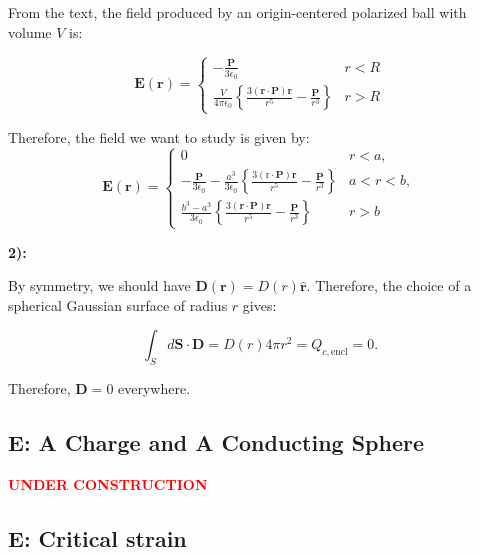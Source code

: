 From the text, the field produced by an origin-centered polarized ball with volume $V$ is:
	
\begin{equation}
	\mathbf{E}(\mathbf{r})=\left\{\begin{array}{ll}-\frac{\mathbf{P}}{3 \epsilon_{0}} & r<R \\
	\frac{V}{4 \pi \epsilon_{0}}\left\{\frac{3(\mathbf{r} \cdot \mathbf{P}) \mathbf{r}}{r^{5}}-\frac{\mathbf{P}}{r^{3}}\right\} & r>R
	\end{array}\right.
\end{equation}

Therefore, the field we want to study is given by:
\begin{equation}
	\mathbf{E}(\mathbf{r})=\left\{\begin{array}{ll}
		0 \quad & r<a, \\
		-\frac{\mathbf{P}}{3 \epsilon_{0}}-\frac{a^{3}}{3 \epsilon_{0}}\left\{\frac{3(\mathrm{r} \cdot \mathbf{P}) \mathbf{r}}{r^{5}}-\frac{\mathbf{P}}{r^{3}}\right\} & a<r<b, \\
		\frac{b^{3}-a^{3}}{3 \epsilon_{0}}\left\{\frac{3(\mathbf{r} \cdot \mathbf{P}) \mathbf{r}}{r^{5}}-\frac{\mathbf{P}}{r^{3}}\right\} & r>b
	\end{array}\right.
\end{equation}

\textbf{2):}

By symmetry, we should have $\mathbf{D}(\mathbf{r})=D(r) \hat{\mathbf{r}}$. Therefore, the choice of a spherical Gaussian surface of radius $r$ gives:

\begin{equation}
	\int_{S} d \mathbf{S} \cdot \mathbf{D}=D(r) 4 \pi r^{2}=Q_{c, \text{encl}}=0.
\end{equation}

Therefore, $\mathbf{D}=0$ everywhere.
	


\subsection{E: A Charge and A Conducting Sphere}\label{E: A Charge and A Conducting Sphere}
\textbf{\textcolor{red}{UNDER CONSTRUCTION}}

\subsection{E: Critical strain}\label{E: Critical strain}

